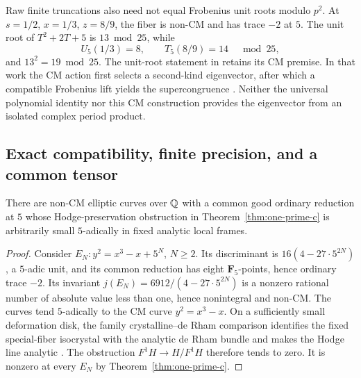 Raw finite truncations also need not equal Frobenius unit roots
modulo $p^2$.  At $s=1/2$, $x=1/3$, $z=8/9$, the fiber is
non-CM and has trace $-2$ at $5$.  The unit root of
$T^2+2T+5$ is $13\bmod25$, while
\[
                  U_5(1/3)=8,\qquad T_5(8/9)=14
                                      \quad\bmod25,
\]
and $13^2=19\bmod25$.  The unit-root statement in
\cite[Theorem 2.2]{BRSTT} retains its CM premise.  In that work
the CM action first selects a second-kind eigenvector, after which
a compatible Frobenius lift yields the supercongruence
\cite[\S2.1, equation (2.3), and Lemma 2.3]{BRSTT}.
Neither the universal polynomial identity nor this CM construction
provides the eigenvector from an isolated complex period product.

\subsection{Exact compatibility, finite precision, and a common tensor}
\begin{proposition}
\label{prop:one-prime-precision-c}
There are non-CM elliptic curves over $\mathbb Q$ with a common good
ordinary reduction at $5$ whose Hodge-preservation obstruction
in Theorem~\ref{thm:one-prime-c} is arbitrarily small $5$-adically
in fixed analytic local frames.
\end{proposition}
\begin{proof}
Consider $E_N:y^2=x^3-x+5^N$, $N\ge2$.  Its discriminant is
$16(4-27\cdot5^{2N})$, a $5$-adic unit, and its common reduction
has eight $\mathbf F_5$-points, hence ordinary trace $-2$.
Its invariant
$j(E_N)=6912/(4-27\cdot5^{2N})$ is a nonzero rational number
of absolute value less than one, hence nonintegral and non-CM.
The curves tend $5$-adically to the CM curve $y^2=x^3-x$.
On a sufficiently small deformation disk, the family
crystalline--de Rham comparison identifies the fixed special-fiber
isocrystal with the analytic de Rham bundle and makes the Hodge
line analytic \cite[\S4.6]{MaulikPoonen}.  The obstruction
$F^1H\to H/F^1H$ therefore tends to zero.  It is nonzero at
every $E_N$ by Theorem~\ref{thm:one-prime-c}.
\end{proof}

